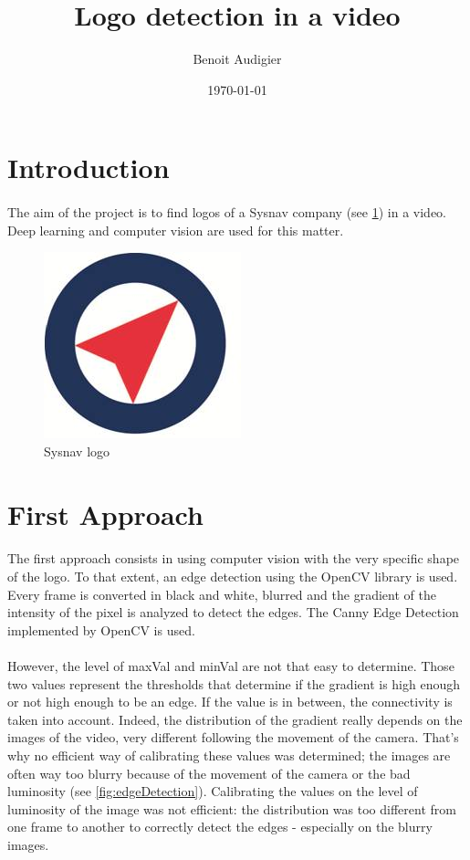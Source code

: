 \documentclass[12pt]{article}%
\begin{document}
\title{Logo detection in a video}
\author{Benoit Audigier}
\date{\today}



\maketitle
\section{Introduction}

\paragraph{}
The aim of the project is to find logos of a Sysnav company (see \ref{fig:logo}) in a video. Deep learning and computer vision are used for this matter.

\begin{figure}[H]
\centering
\includegraphics[width=.2\textwidth]{images/logo.png}
\caption{\label{fig:logo}Sysnav logo}
\end{figure}




\section{First Approach}

\paragraph{}
The first approach consists in using computer vision with the very specific shape of the logo. To that extent, an edge detection using the OpenCV library is used. Every frame is converted in black and white, blurred and the gradient of the intensity of the pixel is analyzed to detect the edges. The Canny Edge Detection \cite{canny} implemented by OpenCV is used. 

\paragraph{}
However, the level of maxVal and minVal are not that easy to determine.  Those two values represent the thresholds that determine if the gradient is high enough or not high enough to be an edge. If the value is in between, the connectivity is taken into account. Indeed, the distribution of the gradient really depends on the images of the video, very different following the movement of the camera. That's why no efficient way of calibrating these values was determined; the images are often way too blurry because of the movement of the camera or the bad luminosity (see \ref{fig:edgeDetection}). Calibrating the values on the level of luminosity of the image was not efficient: the distribution was too different from one frame to another to correctly detect the edges - especially on the blurry images.
\end{document}
